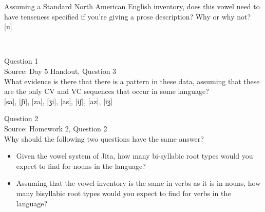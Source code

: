\documentclass[12pt]{article}
\begin{document}
Assuming a Standard North American English inventory, does this vowel need to have tenseness specified if you're giving a prose description? Why or why not?\\

{[u]}


\newpage

\begin{center}
\textbf{{\color{red}{\HUGE END OF EXAM}}}\\

\end{center}
\newpage

\begin{center}
\textbf{{\color{blue}{\HUGE START OF EXAM\\}}}

\textbf{{\color{blue}{\HUGE Student ID: 2014\\}}}

\textbf{{\color{blue}{\HUGE 1:30 - 1:45 PM\\}}}

\end{center}
\newpage

{\large Question 1}\\

Source: Day 5 Handout, Question 3\\

What evidence is there that there is a pattern in these data, assuming that these are the only CV and VC sequences that occur in some language?\\

{[sa]}, {[ʃi]}, {[za]}, {[ʒi]}, {[as]}, {[iʃ]}, {[az]}, {[iʒ]}


\newpage

{\large Question 2}\\

Source: Homework 2, Question 2\\

Why should the following two questions have the same answer?\\

\begin{itemize} \item Given the vowel system of Jita, how many bi-syllabic root types would you expect to find for nouns in the language? \item Assuming that the vowel inventory is the same in verbs as it is in nouns, how many bisyllabic root types would you expect to find for verbs in the language? \end{itemize}
\end{document}
